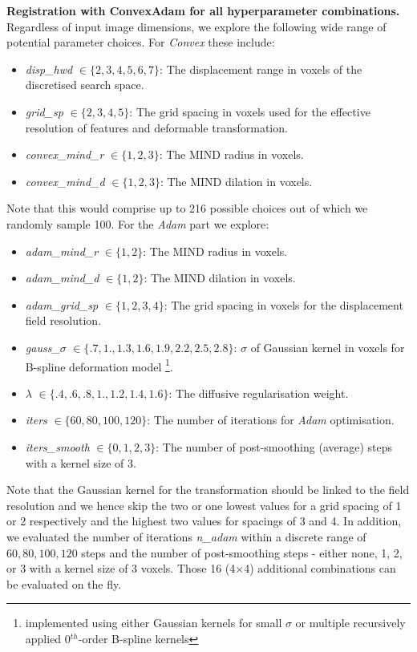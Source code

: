 % 
\noindent \textbf{Registration with ConvexAdam for all hyperparameter combinations.} 
Regardless of input image dimensions, we explore the following wide range of potential parameter choices. For \emph{Convex} these include:
\begin{itemize}
    \item \emph{disp\_hwd} $\in \{2,3,4,5,6,7\}$: The displacement range in voxels of the discretised search space.
    \item \emph{grid\_sp} $\in \{2,3,4,5\}$: The grid spacing in voxels used for the effective resolution of features and deformable transformation.
    \item \emph{convex\_mind\_r} $\in \{1,2,3\}$: The MIND radius in voxels.
    \item \emph{convex\_mind\_d} $\in \{1,2,3\}$: The MIND dilation in voxels.
\end{itemize}
Note that this would comprise up to 216 possible choices out of which we randomly sample 100. For the \emph{Adam} part we explore:
\begin{itemize}
    \item \emph{adam\_mind\_r} $\in \{1,2\}$: The MIND radius in voxels.
    \item \emph{adam\_mind\_d} $\in \{1,2\}$: The MIND dilation in voxels.
    \item \emph{adam\_grid\_sp} $\in \{1,2,3,4\}$: The grid spacing in voxels for the displacement field resolution.
    \item \emph{gauss\_$\sigma$} $\in \{.7,1.,1.3,1.6,1.9,2.2,2.5,2.8\}$:  $\sigma$ of Gaussian kernel in voxels for B-spline deformation model \footnote{ implemented using either Gaussian kernels for small $\sigma$ or multiple recursively applied 0$^{th}$-order B-spline kernels}.
    \item \emph{$\lambda$} $\in \{.4,.6,.8,1.,1.2,1.4,1.6\}$: The diffusive regularisation weight.
    \item \emph{iters} $\in \{60,80,100,120\}$: The number of iterations for \emph{Adam} optimisation.
    \item \emph{iters\_smooth} $\in \{0,1,2,3\}$: The number of post-smoothing (average) steps with a kernel size of 3.
\end{itemize}
Note that the Gaussian kernel for the transformation should be linked to the field resolution and we hence skip the two or one lowest values for a grid spacing of 1 or 2 respectively and the highest two values for spacings of 3 and 4. In addition, we evaluated the number of iterations \emph{n\_adam} within a discrete range of ${60,80,100,120}$ steps and the number of post-smoothing steps - either none, 1, 2, or 3 with a kernel size of 3 voxels. Those 16 (4$\times$4) additional combinations can be evaluated on the fly.
